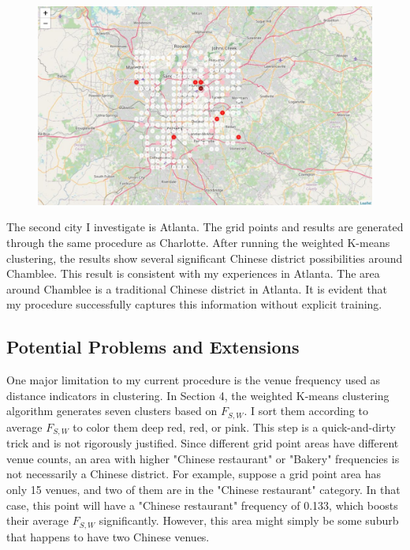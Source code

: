 \documentclass{article}
\begin{document}
\begin{figure}[h!]
\includegraphics[width=1.0\textwidth]{cn5.jpg}
\centering
\end{figure}

The second city I investigate is Atlanta.
The grid points and results are generated through the same procedure as Charlotte.
After running the weighted K-means clustering, the results show several significant Chinese district possibilities around Chamblee.
This result is consistent with my experiences in Atlanta.
The area around Chamblee is a traditional Chinese district in Atlanta.
It is evident that my procedure successfully captures this information without explicit training.

\newpage

\subsection{Potential Problems and Extensions}
One major limitation to my current procedure is the venue frequency used as distance indicators in clustering.
In Section 4, the weighted K-means clustering algorithm generates seven clusters based on $F_{S, W}$. I sort them according to average $F_{S, W}$ to color them deep red, red, or pink.
This step is a quick-and-dirty trick and is not rigorously justified.
Since different grid point areas have different venue counts, an area with higher "Chinese restaurant" or "Bakery" frequencies is not necessarily a Chinese district.
For example, suppose a grid point area has only 15 venues, and two of them are in the "Chinese restaurant" category. In that case, this point will have a "Chinese restaurant" frequency of 0.133, which boosts their average $F_{S, W}$ significantly.
However, this area might simply be some suburb that happens to have two Chinese venues.
\end{document}

